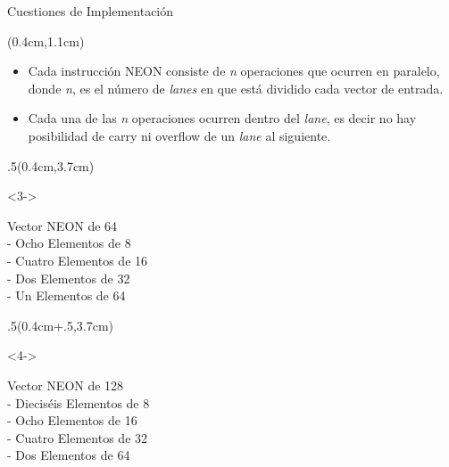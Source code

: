 \begin{frame}{Cuestiones de Implementación}
 \begin{textblock*}{\textwidth}(0.4cm,1.1cm)
  \begin{itemize}[<+->]\justifying
   \item Cada instrucción NEON consiste de \textit{n} operaciones que ocurren en paralelo, donde \textit{n}, es el número de \textit{lanes} en que está dividido cada vector de entrada.
   \item Cada una de las \textit{n} operaciones ocurren dentro del \textit{lane}, es decir no hay posibilidad de carry ni overflow de un \textit{lane} al siguiente.
  \end{itemize}
 \end{textblock*} 
  \begin{textblock*}{.5\textwidth}(0.4cm,3.7cm)
  \begin{onlyenv}<3->
   \begin{tcolorbox}[enhanced jigsaw,rounded corners, drop fuzzy shadow=ShadowColor]
    Vector NEON de \SI{64}{\bit}\\
     - Ocho Elementos de \SI{8}{\bit}\\
     - Cuatro Elementos de \SI{16}{\bit}\\
     - Dos Elementos de \SI{32}{\bit}\\
     - Un Elementos de \SI{64}{\bit}  
   \end{tcolorbox}
  \end{onlyenv} 
 \end{textblock*}
 \begin{textblock*}{.5\textwidth}(0.4cm+.5\textwidth,3.7cm)
  \begin{onlyenv}<4->
   \begin{tcolorbox}[enhanced jigsaw,rounded corners, drop fuzzy shadow=ShadowColor]
    Vector NEON de \SI{128}{\bit}\\
     - Dieciséis Elementos de \SI{8}{\bit}\\
     - Ocho Elementos de \SI{16}{\bit}\\
     - Cuatro Elementos de \SI{32}{\bit}\\
     - Dos Elementos de \SI{64}{\bit} 
   \end{tcolorbox}
  \end{onlyenv} 
 \end{textblock*}
\end{frame}

